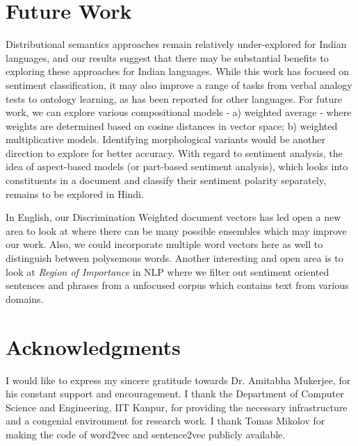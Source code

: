 \documentclass[11pt,a4paper]{article}
\begin{document}
\section{Future Work}
\label{sec:future_work}
Distributional semantics approaches remain relatively under-explored for Indian languages, and our results suggest that there may be substantial benefits to exploring these approaches for Indian languages.  While this work has focused on sentiment classification, it may also improve a range of tasks from verbal analogy tests to ontology learning, as has been reported for other languages.
For future work, we can explore various compositional models - a) weighted average - where weights are determined based on cosine distances in vector space;  b) weighted multiplicative models. Identifying morphological variants would be another direction to explore for better accuracy. With regard to sentiment analysis, the idea of aspect-based models (or part-based sentiment analysis), which looks into constituents in a document and classify their sentiment polarity separately, remains to be explored in Hindi.

In English, our Discrimination Weighted document vectors has led open a new area to look at where there can be many possible ensembles which may improve our work. Also, we could incorporate multiple word vectors here as well to distinguish between polysemous words. Another interesting and open area is to look at \emph{Region of Importance} in NLP where we filter out sentiment oriented sentences and phrases from a unfocused corpus which contains text from various domains.

\section*{Acknowledgments}
I would like to express my sincere gratitude towards Dr. Amitabha Mukerjee, for his  constant support and encouragement. I thank the Department of Computer Science and Engineering, IIT Kanpur, for providing the necessary infrastructure and a congenial environment for research work. I thank Tomas Mikolov for making the code of word2vec and sentence2vec publicly available.



\end{document}
